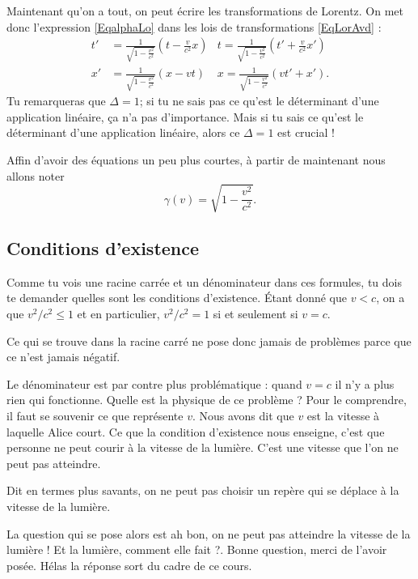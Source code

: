 Maintenant qu'on a tout, on peut écrire les transformations de Lorentz. On met donc l'expression \eqref{EqalphaLo} dans les lois de transformations \eqref{EqLorAvd} :
\begin{equation}
\begin{aligned}		\label{EqTrLorentz}
  t'&= \frac{1}{ \sqrt{1-\frac{ v^2 }{ c^2 }} }\left( t-\frac{ v }{ c^2 }x \right)	& t=	\frac{1}{ \sqrt{1-\frac{ v^2 }{ c^2 }} }\left(t'+\frac{ v }{ c^2 }x'\right)\\
x'&=\frac{1}{ \sqrt{1-\frac{ v^2 }{ c^2 }} }(x-vt)	&x=\frac{1}{ \sqrt{1-\frac{ v^2 }{ c^2 }} }(vt'+x').
\end{aligned}
\end{equation}
Tu remarqueras que $\Delta=1$; si tu ne sais pas ce qu'est le déterminant d'une application linéaire, ça n'a pas d'importance. Mais si tu sais ce qu'est le déterminant d'une application linéaire, alors ce $\Delta=1$ est crucial !

Affin d'avoir des équations un peu plus courtes, à partir de maintenant nous allons noter
\[ 
  \gamma(v)=\sqrt{1-\frac{ v^2 }{ c^2 }}.
\]


\subsection{Conditions d'existence}

Comme tu vois une racine carrée et un dénominateur dans ces formules, tu dois te demander quelles sont les conditions d'existence. Étant donné que $v<c$, on a que $v^2/c^2\leq 1$ et en particulier, $v^2/c^2=1$ si et seulement si $v=c$. 

Ce qui se trouve dans la racine carré ne pose donc jamais de problèmes parce que ce n'est jamais négatif. 

Le dénominateur est par contre plus problématique : quand $v=c$ il n'y a plus rien qui fonctionne. Quelle est la physique de ce problème ? Pour le comprendre, il faut se souvenir ce que représente $v$. Nous avons dit que $v$ est la vitesse à laquelle Alice court. Ce que la condition d'existence nous enseigne, c'est que personne ne peut courir à la vitesse de la lumière. C'est une vitesse que l'on ne peut pas atteindre. 

Dit en termes plus savants, on ne peut pas choisir un repère qui se déplace à la vitesse de la lumière.

La question qui se pose alors est \og ah bon, on ne peut pas atteindre la vitesse de la lumière ! Et la lumière, comment elle fait ?\fg. Bonne question, merci de l'avoir posée. Hélas la réponse sort du cadre de ce cours.


